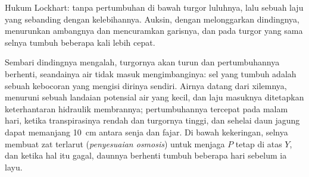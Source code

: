 \begin{omfigure}

{\small Hukum Lockhart: tanpa pertumbuhan di bawah turgor luluhnya,
lalu sebuah laju yang sebanding dengan kelebihannya. Auksin, dengan
melonggarkan dindingnya, menurunkan ambangnya dan mencuramkan garisnya,
dan pada turgor yang sama selnya tumbuh beberapa kali lebih cepat.}
\end{omfigure}

\begin{example}\label{ex:b2:plant-meristems:water}
Sembari dindingnya mengalah, turgornya akan turun dan pertumbuhannya
berhenti, seandainya air tidak masuk mengimbanginya: sel yang tumbuh
adalah sebuah kebocoran yang mengisi dirinya sendiri. Airnya datang
dari xilemnya, menuruni sebuah landaian potensial air yang kecil, dan
laju masuknya ditetapkan keterhantaran hidraulik membrannya;
pertumbuhannya tercepat pada malam hari, ketika transpirasinya rendah
dan turgornya tinggi, dan sehelai daun jagung dapat memanjang
\qty{10}{cm} antara senja dan fajar. Di bawah kekeringan, selnya
membuat zat terlarut (\emph{penyesuaian osmosis}) untuk menjaga $P$
tetap di atas $Y$, dan ketika hal itu gagal, daunnya berhenti tumbuh
beberapa hari sebelum ia layu.
\end{example}

